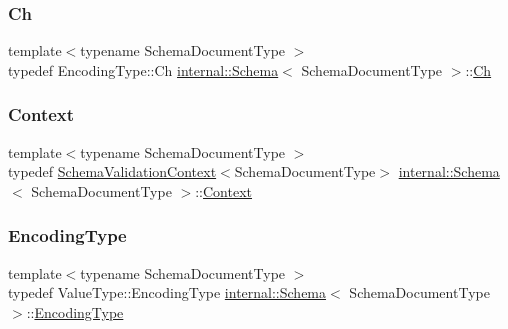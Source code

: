 \mbox{\label{classinternal_1_1Schema_a98043fca39adbf8b42e7472e3d80d6fa}} 
\subsubsection{\texorpdfstring{Ch}{Ch}}
{\footnotesize\ttfamily template$<$typename Schema\+Document\+Type $>$ \\
typedef Encoding\+Type\+::\+Ch \hyperlink{classinternal_1_1Schema}{internal\+::\+Schema}$<$ Schema\+Document\+Type $>$\+::\hyperlink{classinternal_1_1Schema_a98043fca39adbf8b42e7472e3d80d6fa}{Ch}}

\mbox{\label{classinternal_1_1Schema_ac3f54abfefe300c5610c1205869cfd66}} 
\subsubsection{\texorpdfstring{Context}{Context}}
{\footnotesize\ttfamily template$<$typename Schema\+Document\+Type $>$ \\
typedef \hyperlink{structinternal_1_1SchemaValidationContext}{Schema\+Validation\+Context}$<$Schema\+Document\+Type$>$ \hyperlink{classinternal_1_1Schema}{internal\+::\+Schema}$<$ Schema\+Document\+Type $>$\+::\hyperlink{classinternal_1_1Schema_ac3f54abfefe300c5610c1205869cfd66}{Context}}

\mbox{\label{classinternal_1_1Schema_a9ea269c3ca8099c2a14b6519fe34efb1}} 
\subsubsection{\texorpdfstring{Encoding\+Type}{EncodingType}}
{\footnotesize\ttfamily template$<$typename Schema\+Document\+Type $>$ \\
typedef Value\+Type\+::\+Encoding\+Type \hyperlink{classinternal_1_1Schema}{internal\+::\+Schema}$<$ Schema\+Document\+Type $>$\+::\hyperlink{classinternal_1_1Schema_a9ea269c3ca8099c2a14b6519fe34efb1}{Encoding\+Type}}

